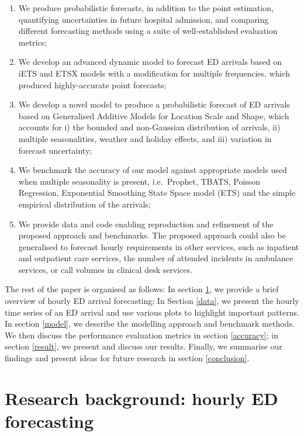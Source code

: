 \documentclass[]{elsarticle} %
\begin{document}
\begin{enumerate}
\def\labelenumi{\arabic{enumi}.}
\item
  We produce probabilistic forecasts, in addition to the point estimation, quantifying uncertainties in future hospital admission, and comparing different forecasting methods using a suite of well-established evaluation metrics;
\item
  We develop an advanced dynamic model to forecast ED arrivals based on iETS \citep{Svetunkov2019a} and ETSX models with a modification for multiple frequencies, which produced highly-accurate point forecasts;
\item
  We develop a novel model to produce a probabilistic forecast of ED arrivals based on Generalised Additive Models for Location Scale and Shape, which accounts for i) the bounded and non-Gaussian distribution of arrivals, ii) multiple seasonalities, weather and holiday effects, and iii) variation in forecast uncertainty;
\item
  We benchmark the accuracy of our model against appropriate models used when multiple seasonality is present, i.e.~Prophet, TBATS, Poisson Regression, Exponential Smoothing State Space model (ETS) and the simple empirical distribution of the arrivals;
\item
  We provide data and code enabling reproduction and refinement of the proposed approach and benchmarks. The proposed approach could also be generalised to forecast hourly requirements in other services, such as inpatient and outpatient care services, the number of attended incidents in ambulance services, or call volumes in clinical desk services.
\end{enumerate}

The rest of the paper is organised as follows: In section \ref{lit}, we provide a brief overview of hourly ED arrival forecasting; In Section \ref{data}, we present the hourly time series of an ED arrival and use various plots to highlight important patterns. In section \ref{model}, we describe the modelling approach and benchmark methods. We then discuss the performance evaluation metrics in section \ref{accuracy}; in section \ref{result}, we present and discuss our results. Finally, we summarise our findings and present ideas for future research in section \ref{conclusion}.

\hypertarget{lit}{%
\section{Research background: hourly ED forecasting}\label{lit}}
\end{document}
